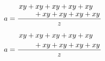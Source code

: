 \documentclass[12pt,openany]{book} %
\begin{document}


\pagestyle{empty} %
\tableofcontents %

\cleardoublepage %

\pagestyle{fancy} %










\begin{codeshow}
	\[
	a=\frac{
		\splitfrac{xy + xy + xy + xy + xy}
		{+ xy + xy + xy + xy}
	}
	{z}
	\]
\end{codeshow}
\begin{codeshow}
	\[
	a=\frac{
		\splitdfrac{xy + xy + xy + xy + xy}
		{+ xy + xy + xy + xy}
	}
	{z}
	\]
\end{codeshow}

\cleardoublepage
{}
\setlength{\columnsep}{0.75cm}
\printindex
\end{document}
